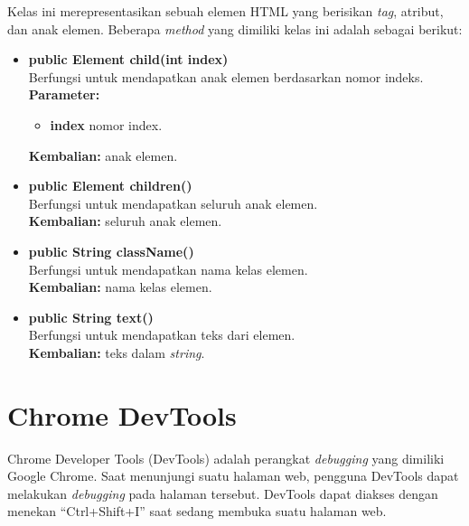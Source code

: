 Kelas ini merepresentasikan sebuah elemen HTML yang berisikan \textit{tag}, atribut, dan anak elemen. Beberapa \textit{method} yang dimiliki kelas ini adalah sebagai berikut:
\begin{itemize}
	\item \textbf{public Element child(int index)} \\
		Berfungsi untuk mendapatkan anak elemen berdasarkan nomor indeks. \\
		\textbf{Parameter:} 
		\begin{itemize}
			\item \textbf{index} nomor index.
		\end{itemize}
		\textbf{Kembalian:} anak elemen.	
		
		\item \textbf{public Element children()} \\
		Berfungsi untuk mendapatkan seluruh anak elemen. \\
		\textbf{Kembalian:} seluruh anak elemen.	
		
		\item \textbf{public String className()} \\
		Berfungsi untuk mendapatkan nama kelas elemen. \\
		\textbf{Kembalian:} nama kelas elemen.	
		
		\item \textbf{public String text()} \\
		Berfungsi untuk mendapatkan teks dari elemen. \\
		\textbf{Kembalian:} teks dalam \textit{string}.	
\end{itemize}



\section{Chrome DevTools}
\label{sec:devtools}

Chrome Developer Tools (DevTools) adalah perangkat \textit{debugging} yang dimiliki Google Chrome\cite{devtools}. Saat menunjungi suatu halaman web, pengguna DevTools dapat melakukan \textit{debugging} pada halaman tersebut. DevTools dapat diakses dengan menekan ``Ctrl+Shift+I'' saat sedang membuka suatu halaman web.  


